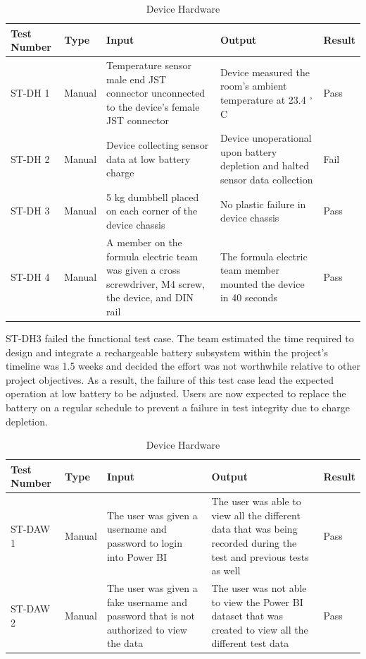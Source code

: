 \documentclass[12pt, titlepage]{article}
\begin{document}
\begin{table}[!htbp]
  \begin{tabular}{| p{} | p{}| p{}| p{}| p{}|}
    \hline
    \rowcolor[gray]{0.9}
    Test Number & Type & Input & Output & Result\\
    \hline
    ST-DH 1 & Manual & Temperature sensor male end JST connector unconnected to the device's female JST connector & Device measured the room's ambient temperature at 23.4 $^{\circ}$C & Pass \\
    \hline
    ST-DH 2 & Manual & Device collecting sensor data at low battery charge & Device unoperational upon battery depletion and halted sensor data collection & Fail \\
    \hline
    ST-DH 3 & Manual & 5 kg dumbbell placed on each corner of the device chassis & No plastic failure in device chassis & Pass  \\
    \hline
    ST-DH 4 & Manual & A member on the formula electric team was given a cross screwdriver, M4 screw, the device, and DIN rail & The formula electric team member mounted the device in 40 seconds & Pass  \\
    \hline
  \end{tabular}
  \caption{Device Hardware}
  \end{table} 
  \newpage 

  ST-DH3 failed the functional test case. The team estimated the time required to design and integrate a rechargeable battery subsystem within the project's timeline was 1.5 weeks and decided the effort was not worthwhile relative to other project objectives. As a result, the failure of this test case lead the expected operation at low battery to be adjusted. Users are now expected to replace the battery on a regular schedule to prevent a failure in test integrity due to charge depletion. \\

\begin{table}[!htbp]
  \begin{tabular}{| p{} | p{}| p{}| p{}| p{}|}
    \hline
    \rowcolor[gray]{0.9}
    Test Number & Type & Input & Output & Result\\
    \hline
    ST-DAW 1 & Manual & The user was given a username and password to login into Power BI & The user was able to view all the different data that was being recorded during the test and previous tests as well & Pass\\
    \hline
    ST-DAW 2 & Manual & The user was given a fake username and password that is not authorized to view the data & The user was not able to view the Power BI dataset that was created to view all the different test data & Pass\\
  \end{tabular}
  \caption{Device Hardware}
  \end{table} 
\end{document}
